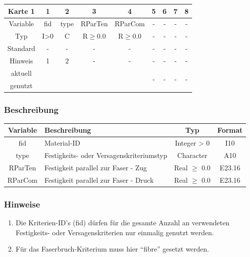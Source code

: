 \documentclass[11pt,titlepage,listof=totoc,bibliography=totoc,twoside]{scrreprt}
\begin{document}
{{\begin{table}[htbp]
\centering
\begin{tabularx}{\textwidth}{cCCCCCCCC}
\toprule
Karte 1	& 1		& 2		& 3		& 4		& 5		& 6		& 7		& 8		\\
\midrule
Variable& fid		& type		& RParTen	& RParCom	& -		& -		& -		& -		\\
Typ	& I>0		& C		& R$\ge$0.0	& R$\ge$0.0	& -		& -		& -		& -		\\
Standard& -		& -		& -		& -		& -		& -		& -		& -		\\
Hinweis	& 1		& 2		& -		& -		& -		& -		& -		& -		\\
aktuell	& 	& 	& 	& 	& 	& \multirow{2}{*}{-}	& 	& 	\\
genutzt \\
\bottomrule
\end{tabularx}
\end{table}

\subsubsection{Beschreibung}

\begin{tabularx}{\textwidth}{cXcc}
\toprule
Variable& Beschreibung														& Typ			& Format\\
\midrule
fid	& Material-ID														& Integer > 0		& I10	\\
type	& Festigkeits- oder Versagenskriteriumstyp										& Character		& A10	\\
RParTen	& Festigkeit parallel zur Faser - Zug											& Real $\ge$ 0.0	& E23.16\\
RParCom	& Festigkeit parallel zur Faser - Druck											& Real $\ge$ 0.0	& E23.16\\
\bottomrule
\end{tabularx}

\subsubsection{Hinweise}

\begin{enumerate}
\item Die Kriterien-ID's (fid) dürfen für die gesamte Anzahl an verwendeten Festigkeits- oder Versagenskriterien nur einmalig genutzt werden.
\item Für das Faserbruch-Kriterium muss hier ``fibre'' gesetzt werden.
\end{enumerate}

}}
\end{document}

